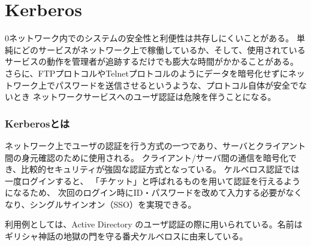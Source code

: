 \documentclass[11pt,a4j,titlepage]{jreport}
\begin{document}

\section{Kerberos}
\if0ネットワーク内でのシステムの安全性と利便性は共存しにくいことがある。
単純にどのサービスがネットワーク上で稼働しているか、そして、使用されているサービスの動作を管理者が追跡するだけでも膨大な時間がかかることがある。
さらに、FTPプロトコルやTelnetプロトコルのようにデータを暗号化せずにネットワーク上でパスワードを送信させるというような、プロトコル自体が安全でないとき
ネットワークサービスへのユーザ認証は危険を伴うことになる。
\fi

\subsubsection*{Kerberosとは}
ネットワーク上でユーザの認証を行う方式の一つであり、サーバとクライアント間の身元確認のために使用される。
クライアント/サーバ間の通信を暗号化でき、比較的セキュリティが強固な認証方式となっている。
ケルベロス認証では一度ログインすると、
「チケット」と呼ばれるものを用いて認証を行えるようになるため、
次回のログイン時にID・パスワードを改めて入力する必要がなくなり、シングルサインオン（SSO）を実現できる。\par 
利用例としては、Active Directory のユーザ認証の際に用いられている。名前はギリシャ神話の地獄の門を守る番犬ケルベロスに由来している。
\end{document}
